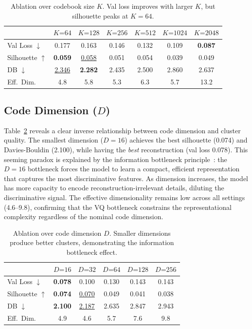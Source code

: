 \documentclass[pmlr]{jmlr}%
\newcommand{\best}[1]{\textbf{#1}}
\newcommand{\second}[1]{\underline{#1}}
\begin{document}
\begin{table}[t]
  \centering
  \caption{Ablation over codebook size $K$. Val loss improves with larger $K$, but silhouette peaks at $K = 64$.}
  \label{tab:ablation_codebook}
  \small
  \begin{tabular}{lcccccc}
  \toprule
  & $K\text{=}64$ & $K\text{=}128$ & $K\text{=}256$ & $K\text{=}512$ & $K\text{=}1024$ & $K\text{=}2048$ \\
  \midrule
  Val Loss $\downarrow$ & 0.177 & 0.163 & 0.146 & 0.132 & 0.109 & \best{0.087} \\
  Silhouette $\uparrow$ & \best{0.059} & \second{0.058} & 0.051 & 0.054 & 0.039 & 0.049 \\
  DB $\downarrow$ & \second{2.346} & \best{2.282} & 2.435 & 2.500 & 2.860 & 2.637 \\
  Eff.\ Dim. & 4.8 & 5.8 & 5.3 & 6.3 & 5.7 & 13.2 \\
  \bottomrule
  \end{tabular}
\end{table}

\subsection{Code Dimension ($D$)}

Table~\ref{tab:ablation_codedim} reveals a clear inverse relationship between code dimension and cluster quality. The smallest dimension ($D = 16$) achieves the best silhouette (0.074) and Davies-Bouldin (2.100), while having the \emph{best} reconstruction (val loss 0.078). This seeming paradox is explained by the information bottleneck principle~\citep{tishby2000information}: the $D = 16$ bottleneck forces the model to learn a compact, efficient representation that captures the most discriminative features. As dimension increases, the model has more capacity to encode reconstruction-irrelevant details, diluting the discriminative signal. The effective dimensionality remains low across all settings (4.6--9.8), confirming that the VQ bottleneck constrains the representational complexity regardless of the nominal code dimension.

\begin{table}[t]
  \centering
  \caption{Ablation over code dimension $D$. Smaller dimensions produce better clusters, demonstrating the information bottleneck effect.}
  \label{tab:ablation_codedim}
  \small
  \begin{tabular}{lccccc}
  \toprule
  & $D\text{=}16$ & $D\text{=}32$ & $D\text{=}64$ & $D\text{=}128$ & $D\text{=}256$ \\
  \midrule
  Val Loss $\downarrow$ & \best{0.078} & 0.100 & 0.130 & 0.143 & 0.143 \\
  Silhouette $\uparrow$ & \best{0.074} & \second{0.070} & 0.049 & 0.041 & 0.038 \\
  DB $\downarrow$ & \best{2.100} & \second{2.187} & 2.635 & 2.847 & 2.943 \\
  Eff.\ Dim. & 4.9 & 4.6 & 5.7 & 7.6 & 9.8 \\
  \bottomrule
  \end{tabular}
\end{table}
\end{document}

